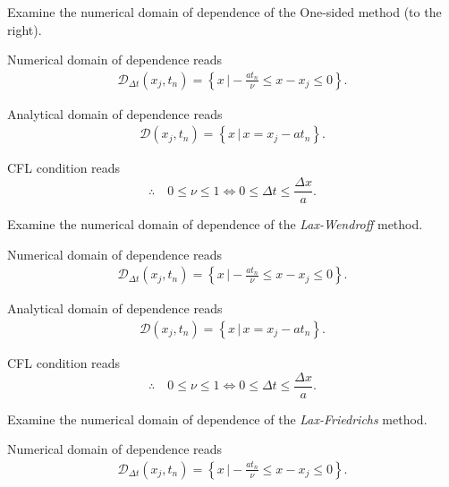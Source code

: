 \documentclass[12pt]{article}
\begin{document}
\pagebreak
\begin{example}
	Examine the numerical domain of dependence of the One-sided method (to the right).
\end{example}

Numerical domain of dependence reads
\begin{align}
	\mathcal{D}_{\Delta t}\left(x_j,t_n\right)
	=  \left\{ x \, \Big| -\frac{at_n}{\nu} \leq x - x_j \leq 0 \right\}.
\end{align}

Analytical domain of dependence reads
\begin{align}
	\mathcal{D}\left(x_j,t_n\right)
	=  \left\{ x \, \Big|\, x = x_{j} - at_n \right\} .
\end{align}

CFL condition reads
\begin{equation}
	\therefore\quad
	\boxed{
		0 \leq \nu \leq 1
		\Leftrightarrow 
		0 \leq \Delta t \leq \frac{\Delta x}{a}.
	}
\end{equation}

\pagebreak
\begin{example}
	Examine the numerical domain of dependence of the \emph{Lax-Wendroff} method.
\end{example}

Numerical domain of dependence reads
\begin{align}
	\mathcal{D}_{\Delta t}\left(x_j,t_n\right)
	=  \left\{ x \, \Big| -\frac{at_n}{\nu} \leq x - x_j \leq 0 \right\}.
\end{align}

Analytical domain of dependence reads
\begin{align}
	\mathcal{D}\left(x_j,t_n\right)
	=  \left\{ x \, \Big|\, x = x_{j} - at_n \right\} .
\end{align}

CFL condition reads
\begin{equation}
	\therefore\quad
	\boxed{
		0 \leq \nu \leq 1
		\Leftrightarrow 
		0 \leq \Delta t \leq \frac{\Delta x}{a}.
	}
\end{equation}

\pagebreak
\begin{example}
	Examine the numerical domain of dependence of the \emph{Lax-Friedrichs} method.
\end{example}
Numerical domain of dependence reads
\begin{align}
	\mathcal{D}_{\Delta t}\left(x_j,t_n\right)
	=  \left\{ x \, \Big| -\frac{at_n}{\nu} \leq x - x_j \leq 0 \right\}.
\end{align}
\end{document}
